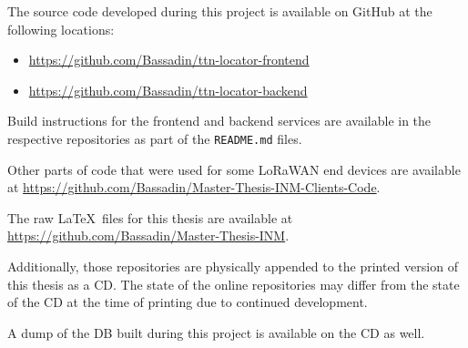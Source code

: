
The source code developed during this project is available on GitHub at the following locations:

\begin{itemize}
    \item \url{https://github.com/Bassadin/ttn-locator-frontend}
    \item \url{https://github.com/Bassadin/ttn-locator-backend}
\end{itemize}

Build instructions for the frontend and backend services are available in the respective repositories as part of the \texttt{README.md} files.

Other parts of code that were used for some \ac{LoRaWAN} end devices are available at \url{https://github.com/Bassadin/Master-Thesis-INM-Clients-Code}.

The raw \LaTeX~files for this thesis are available at \url{https://github.com/Bassadin/Master-Thesis-INM}.

Additionally, those repositories are physically appended to the printed version of this thesis as a CD\@.
The state of the online repositories may differ from the state of the CD at the time of printing due to continued development.

A dump of the \acl{DB} built during this project is available on the CD as well.